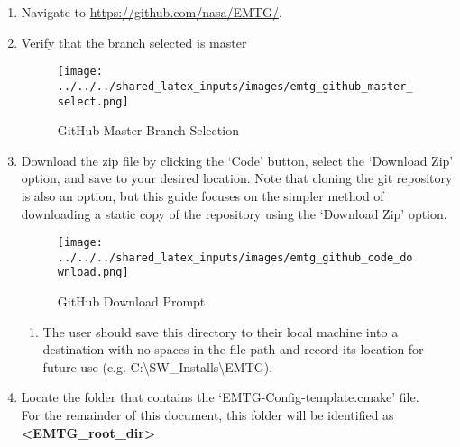 
\begin{enumerate}
	\item Navigate to \url{https://github.com/nasa/EMTG/}.
	\item Verify that the branch selected is master
		\begin{figure}[H]
			\centering
			\texttt{[image: ../../../shared\_latex\_inputs/images/emtg\_github\_master\_select.png]}
			\caption{GitHub Master Branch Selection}
		\end{figure}
	\item Download the zip file by clicking the ‘Code’ button, select the ‘Download Zip’ option, and save to your desired location. Note that cloning the git repository is also an option, but this guide focuses on the simpler method of downloading a static copy of the repository using the `Download Zip' option. 
		\begin{figure}[H]
			\centering
			\texttt{[image: ../../../shared\_latex\_inputs/images/emtg\_github\_code\_download.png]}
			\caption{GitHub Download Prompt}
		\end{figure}
	\begin{enumerate}
		\item The user should save this directory to their local machine into a destination with no spaces in the file path and record its location for future use (e.g. C:\textbackslash SW\_Installs\textbackslash EMTG).
	\end{enumerate}
	\item Locate the folder that contains the ‘EMTG-Config-template.cmake’ file. \\ For the remainder of this document, this folder will be identified as \textbf{\textless EMTG\_root\_dir\textgreater}	
\end{enumerate}